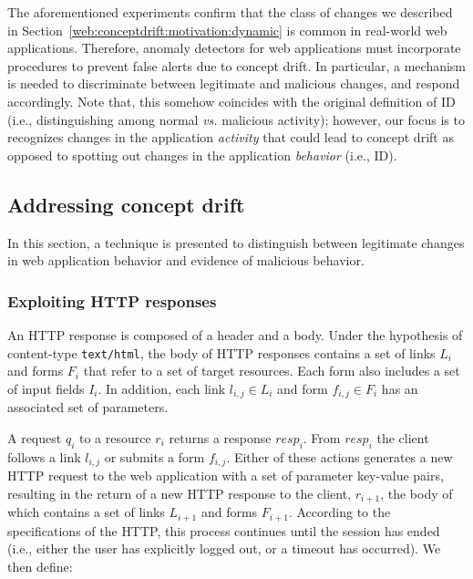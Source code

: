 The aforementioned experiments confirm that the class of changes we described in Section~\ref{web:conceptdrift:motivation:dynamic} is common in real-world web applications. Therefore, anomaly detectors for web applications must incorporate procedures to prevent false alerts due to concept drift. In particular, a mechanism is needed to discriminate between legitimate and malicious changes, and respond accordingly. Note that, this somehow coincides with the original definition of \ac{ID} (i.e., distinguishing among normal \emph{vs.} malicious activity); however, our focus is to recognizes changes in the application \emph{activity} that could lead to concept drift as opposed to spotting out changes in the application \emph{behavior} (i.e., \ac{ID}).

\subsection{Addressing concept drift}
\label{web:conceptdrift:design}
In this section, a technique is presented to distinguish between legitimate changes in web application behavior and evidence of malicious behavior.

\subsubsection{Exploiting HTTP responses}
\label{web:conceptdrift:design:oracle}
An \ac{HTTP} response is composed of a header and a body. Under the hypothesis of content-type \texttt{text/html}, the body of \ac{HTTP} responses contains a set of links $L_i$ and forms $F_i$ that refer to a set of target resources.  Each form also includes a set of input fields $I_i$.  In addition, each link $l_{i,j}\in L_i$ and form $f_{i,j}\in F_i$ has an associated set of parameters.

A request $q_{i}$ to a resource $r_{i}$ returns a response $resp_{i}$. From $resp_{i}$ the client follows a link $l_{i,j}$ or submits a form $f_{i,j}$.  Either of these actions generates a new \ac{HTTP} request to the web application with a set of parameter key-value pairs, resulting in the return of a new \ac{HTTP} response to the client, $r_{i+1}$, the body of which contains a set of links $L_{i+1}$ and forms $F_{i+1}$. According to the specifications of the \ac{HTTP}, this process continues until the session has ended (i.e., either the user has explicitly logged out, or a timeout has occurred). We then define:

